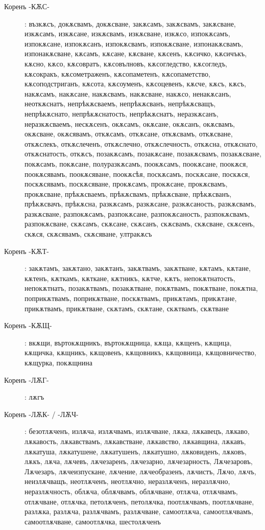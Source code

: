 \documentclass{article}
\begin{document}
\begin{description}
	\item[Коренъ -КѪС-]: възкѫсъ, докѫсвамъ, докѫсване, закѫсамъ, закѫсвамъ, закѫсване, изкѫсамъ, изкѫсане, изкѫсвамъ, изкѫсване, изкѫсо, изпокѫсамъ, изпокѫсане, изпокѫсанъ, изпокѫсвамъ, изпокѫсване, изпонакѫсвамъ, изпонакѫсване, кѫсамъ, кѫсане, кѫсване, кѫсенъ, кѫсичко, кѫсичъкъ, кѫсно, кѫсо, кѫсовратъ, кѫсовълновъ, кѫсогледство, кѫсогледъ, кѫсокракъ, кѫсометраженъ, кѫсопаметенъ, кѫсопаметство, кѫсоподстриганъ, кѫсота, кѫсоуменъ, кѫсоцевенъ, кѫсче, кѫсъ, кѫсъ, накѫсамъ, накѫсане, накѫсвамъ, накѫсване, накѫсо, ненакѫсанъ, неоткѫснатъ, непрѣкѫсваемъ, непрѣкѫсванъ, непрѣкѫсващъ, непрѣкѫснато, непрѣкѫснатость, непрѣкѫснатъ, неразкѫсанъ, неразкѫсваемъ, нескѫсенъ, окѫсамъ, окѫсане, окѫсанъ, окѫсвамъ, окѫсване, окѫсявамъ, откѫсамъ, откѫсане, откѫсвамъ, откѫсване, откѫслекъ, откѫслеченъ, откѫслечно, откѫслечность, откѫсна, откѫснато, откѫснатость, откѫсъ, позакѫсамъ, позакѫсане, позакѫсвамъ, позакѫсване, покѫсамъ, покѫсане, полуразкѫсамъ, поокѫсамъ, поокѫсане, поокѫся, поокѫсявамъ, поокѫсяване, поокѫсѣя, поскѫсамъ, поскѫсане, поскѫся, поскѫсявамъ, поскѫсяване, прокѫсамъ, прокѫсане, прокѫсвамъ, прокѫсване, прѣкѫсваемъ, прѣкѫсвамъ, прѣкѫсване, прѣкѫсванъ, прѣкѫсвачъ, прѣкѫсна, разкѫсамъ, разкѫсане, разкѫсаность, разкѫсвамъ, разкѫсване, разпокѫсамъ, разпокѫсане, разпокѫсаность, разпокѫсвамъ, разпокѫсване, скѫсамъ, скѫсане, скѫсанъ, скѫсвамъ, скѫсване, скѫсенъ, скѫся, скѫсявамъ, скѫсяване, ултракѫсъ
	
	\item[Коренъ -КѪТ-]: закѫтамъ, закѫтано, закѫтанъ, закѫтвамъ, закѫтване, кѫтамъ, кѫтане, кѫтенъ, кѫткамъ, кѫткане, кѫтникъ, кѫтче, кѫтъ, непокѫтнатость, непокѫтнатъ, позакѫтвамъ, позакѫтване, покѫтвамъ, покѫтване, покѫтна, поприкѫтвамъ, поприкѫтване, поскѫтвамъ, прикѫтамъ, прикѫтане, прикѫтвамъ, прикѫтване, скѫтамъ, скѫтане, скѫтвамъ, скѫтване
	
	\item[Коренъ -КѪЩ-]: вкѫщи, въртокѫщникъ, въртокѫщница, кѫща, кѫщенъ, кѫщица, кѫщичка, кѫщникъ, кѫщовенъ, кѫщовникъ, кѫщовница, кѫщовничество, кѫщурка, покѫщнина
	
	\item[Коренъ -ЛѪГ-]: лѫгъ
	
	\item[Коренъ -ЛѪК- / -ЛѪЧ-]: безотлѫченъ, излѫча, излѫчвамъ, излѫчване, лѫка, лѫкавецъ, лѫкаво, лѫкавость, лѫкавствамъ, лѫкавстване, лѫкавство, лѫкавщина, лѫкавъ, лѫкатуша, лѫкатушене, лѫкатушенъ, лѫкатушно, лѫковиденъ, лѫковъ, лѫкъ, лѫча, лѫчевъ, лѫчезаренъ, лѫчезарно, лѫчезарность, Лѫчезаровъ, Лѫчезаръ, лѫчеизпускане, лѫчение, лѫчеобразенъ, лѫчистъ, Лѫчо, лѫчъ, неизлѫчващъ, неотлѫченъ, неотлѫчно, неразлѫченъ, неразлѫчно, неразлѫчность, облѫча, облѫчвамъ, облѫчване, отлѫча, отлѫчвамъ, отлѫчване, отлѫчка, петолѫченъ, петолѫчка, поотлѫчвамъ, поотлѫчване, разлѫка, разлѫча, разлѫчвамъ, разлѫчване, самоотлѫча, самоотлѫчвамъ, самоотлѫчване, самоотлѫчка, шестолѫченъ
	

\end{description}
\end{document}
